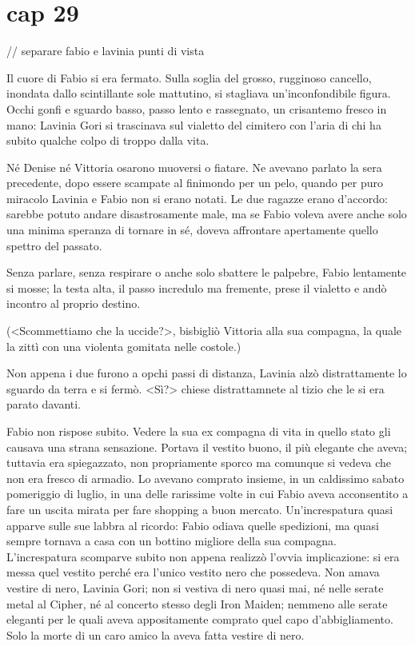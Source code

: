 \chapter{cap 29}

// separare fabio e lavinia punti di vista

Il cuore di Fabio si era fermato. Sulla soglia del grosso, rugginoso
cancello, inondata dallo scintillante sole mattutino, si stagliava
un'inconfondibile figura. Occhi gonfi e sguardo basso, passo lento e
rassegnato, un crisantemo fresco in mano: Lavinia Gori si trascinava sul
vialetto del cimitero con l'aria di chi ha subito qualche colpo di
troppo dalla vita.

Né Denise né Vittoria osarono muoversi o fiatare. Ne avevano parlato la
sera precedente, dopo essere scampate al finimondo per un pelo, quando
per puro miracolo Lavinia e Fabio non si erano notati. Le due ragazze
erano d'accordo: sarebbe potuto andare disastrosamente male, ma se Fabio
voleva avere anche solo una minima speranza di tornare in sé, doveva
affrontare apertamente quello spettro del passato.

Senza parlare, senza respirare o anche solo sbattere le palpebre, Fabio
lentamente si mosse; la testa alta, il passo incredulo ma fremente,
prese il vialetto e andò incontro al proprio destino.

(\textless{}Scommettiamo che la uccide?\textgreater{}, bisbigliò
Vittoria alla sua compagna, la quale la zittì con una violenta gomitata
nelle costole.)

Non appena i due furono a opchi passi di distanza, Lavinia alzò
distrattamente lo sguardo da terra e si fermò.
\textless{}Sì?\textgreater{} chiese distrattamnete al tizio che le si
era parato davanti.

Fabio non rispose subito. Vedere la sua ex compagna di vita in quello
stato gli causava una strana sensazione. Portava il vestito buono, il
più elegante che aveva; tuttavia era spiegazzato, non propriamente
sporco ma comunque si vedeva che non era fresco di armadio. Lo avevano
comprato insieme, in un caldissimo sabato pomeriggio di luglio, in una
delle rarissime volte in cui Fabio aveva acconsentito a fare un uscita
mirata per fare shopping a buon mercato. Un'increspatura quasi apparve
sulle sue labbra al ricordo: Fabio odiava quelle spedizioni, ma quasi
sempre tornava a casa con un bottino migliore della sua compagna.
L'increspatura scomparve subito non appena realizzò l'ovvia
implicazione: si era messa quel vestito perché era l'unico vestito nero
che possedeva. Non amava vestire di nero, Lavinia Gori; non si vestiva
di nero quasi mai, né nelle serate metal al Cipher, né al concerto
stesso degli Iron Maiden; nemmeno alle serate eleganti per le quali
aveva appositamente comprato quel capo d'abbigliamento. Solo la morte di
un caro amico la aveva fatta vestire di nero.

